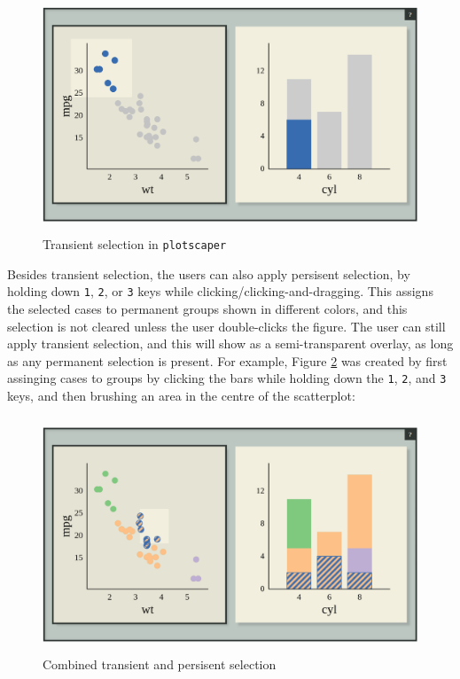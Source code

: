 \documentclass[12pt,a4paper]{article}
\begin{document}
\begin{figure}[H]
\centering
\includegraphics[height=70mm]{./fig_plotscape2.png}
\caption{Transient selection in \texttt{plotscaper}}
\label{fig:plotscapertransient}
\end{figure}

Besides transient selection, the users can also apply persisent selection, by holding down \texttt{1}, \texttt{2}, or \texttt{3} keys while clicking/clicking-and-dragging. This assigns the selected cases to permanent groups shown in different colors, and this selection is not cleared unless the user double-clicks the figure. The user can still apply transient selection, and this will show as a semi-transparent overlay, as long as any permanent selection is present. For example, Figure \ref{fig:plotscaperpersistent} was created by first assinging cases to groups by clicking the bars while holding down the \texttt{1}, \texttt{2}, and \texttt{3} keys, and then brushing an area in the centre of the scatterplot:  

\begin{figure}[H]
\centering
\includegraphics[height=70mm]{./fig_plotscape3.png}
\caption{Combined transient and persisent selection}
\label{fig:plotscaperpersistent}
\end{figure}
\end{document}
